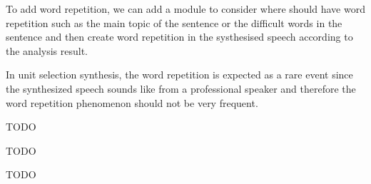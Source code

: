\documentclass[12pt]{article}
\newenvironment{problem}[2][Problem]{\begin{trivlist}
\item[\hskip \labelsep {\bfseries #1}\hskip \labelsep {\bfseries #2.}]}{\end{trivlist}}
\begin{document}
\begin{problem}{2.2}
    To add word repetition, we can add a module to consider where should have
    word repetition such as the main topic of the sentence or the difficult words
    in the sentence and then create word repetition in the systhesised speech according
    to the analysis result.

    In unit selection synthesis, the word repetition is expected as a rare event
    since the synthesized speech sounds like from a professional speaker and therefore
    the word repetition phenomenon should not be very frequent.
\end{problem}

\begin{problem}{2.3}
    TODO
\end{problem}

\begin{problem}{3.1}
    TODO
\end{problem}

\begin{problem}{3.2}
    TODO
\end{problem}
\end{document}
